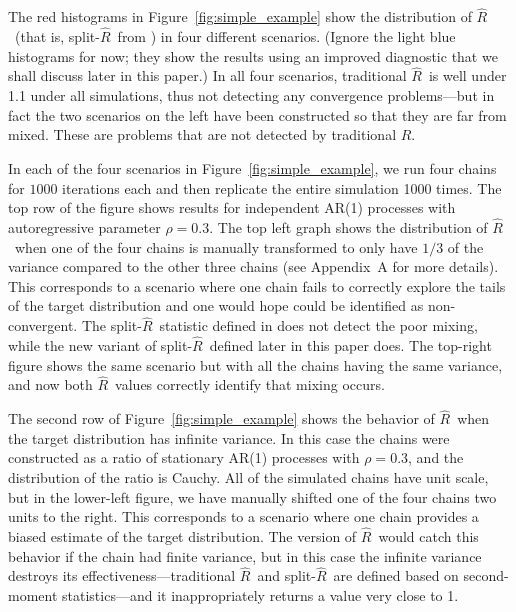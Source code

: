 \documentclass[american,]{article}
\newcommand{\Rhat}{$\widehat{R}$}
\newcommand{\sRhat}{split-$\widehat{R}$}
\theoremstyle{definition}
\begin{document}
The red histograms in Figure~\ref{fig:simple_example} show the distribution of \Rhat\  (that is, \sRhat\ from \cite{BDA3}) in four different scenarios.  (Ignore the light blue histograms for now; they show the results using an improved diagnostic that we shall discuss later in this paper.)  In all four scenarios, traditional \Rhat\ is well under 1.1 under all simulations, thus not detecting any convergence problems---but in fact the two scenarios on the left have been constructed so that they are far from mixed.  These are problems that are not detected by traditional \Rhat.

In each of the four scenarios in  Figure~\ref{fig:simple_example}, we run four chains for $1000$ iterations each and then replicate the entire simulation 1000 times. The top row of the figure shows results for independent AR(1) processes with autoregressive parameter $\rho=0.3$. The top left graph shows the distribution of \Rhat\ when one of the four chains is manually transformed to only have $1/3$ of the variance 
compared to the other three chains (see Appendix~A for more details). This corresponds to a scenario where one chain fails to correctly explore the tails of the target distribution and one would hope could be identified as non-convergent. The \sRhat\ statistic defined in \citet{BDA3} does not detect the poor mixing, while the new variant of \sRhat\ defined later in this paper does. The top-right figure shows the same scenario but with all the chains having the same variance, and now both \Rhat\ values correctly identify that mixing occurs.

The second row of Figure~\ref{fig:simple_example} shows the behavior of \Rhat\ when the target distribution has infinite variance. In this case the chains were constructed as a ratio of stationary AR(1) processes with  $\rho=0.3$, and the distribution of the ratio is Cauchy.  All of the simulated chains have  unit scale, but in the lower-left figure, we have manually shifted one of the four chains two units to the right. This corresponds to a scenario where one chain provides a biased estimate of the target distribution. The \citet{BDA3} version of \Rhat\ would catch this behavior if the chain had finite variance, but in this case the infinite variance destroys its effectiveness---traditional  \Rhat\ and \sRhat\ are defined based on second-moment statistics---and it inappropriately returns a value very close to 1.
\end{document}
